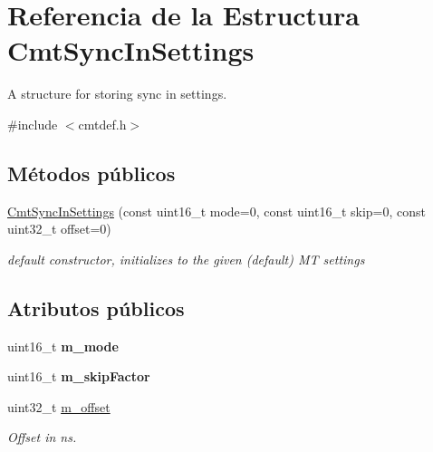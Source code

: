 \hypertarget{structCmtSyncInSettings}{\section{\-Referencia de la \-Estructura \-Cmt\-Sync\-In\-Settings}
\label{structCmtSyncInSettings}
}


\-A structure for storing sync in settings.  




{\ttfamily \#include $<$cmtdef.\-h$>$}

\subsection*{\-Métodos públicos}
\begin{DoxyCompactItemize}
\item 
\hypertarget{structCmtSyncInSettings_ac0ba6c440b9e3ffb4423a2eea6e37fc4}{\hyperlink{structCmtSyncInSettings_ac0ba6c440b9e3ffb4423a2eea6e37fc4}{\-Cmt\-Sync\-In\-Settings} (const uint16\-\_\-t mode=0, const uint16\-\_\-t skip=0, const uint32\-\_\-t offset=0)}\label{structCmtSyncInSettings_ac0ba6c440b9e3ffb4423a2eea6e37fc4}

\begin{DoxyCompactList}\small\item\em default constructor, initializes to the given (default) \-M\-T settings \end{DoxyCompactList}\end{DoxyCompactItemize}
\subsection*{\-Atributos públicos}
\begin{DoxyCompactItemize}
\item 
\hypertarget{structCmtSyncInSettings_a1599babd05fb80734dfe3ff462e899ed}{uint16\-\_\-t {\bfseries m\-\_\-mode}}\label{structCmtSyncInSettings_a1599babd05fb80734dfe3ff462e899ed}

\item 
\hypertarget{structCmtSyncInSettings_a1ed3c1db336a84cb6687f22c60363680}{uint16\-\_\-t {\bfseries m\-\_\-skip\-Factor}}\label{structCmtSyncInSettings_a1ed3c1db336a84cb6687f22c60363680}

\item 
\hypertarget{structCmtSyncInSettings_a1173ce5dc1a20c02d089c1ea54f5bd57}{uint32\-\_\-t \hyperlink{structCmtSyncInSettings_a1173ce5dc1a20c02d089c1ea54f5bd57}{m\-\_\-offset}}\label{structCmtSyncInSettings_a1173ce5dc1a20c02d089c1ea54f5bd57}

\begin{DoxyCompactList}\small\item\em \-Offset in ns. \end{DoxyCompactList}\end{DoxyCompactItemize}


